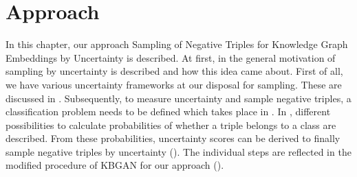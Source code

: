 \chapter{Approach}
\label{ch:approach}
%
In this chapter, our approach Sampling of Negative Triples for Knowledge Graph Embeddings by Uncertainty is described.
At first, in  the general motivation of sampling by uncertainty is described and how this idea came about.
First of all, we have various uncertainty frameworks at our disposal for sampling.
These are discussed in .
Subsequently, to measure uncertainty and sample negative triples, a classification problem needs to be defined which takes place in .
In , different possibilities to calculate probabilities of whether a triple belongs to a class are described.
From these probabilities, uncertainty scores can be derived to finally sample negative triples by uncertainty ().
The individual steps are reflected in the modified procedure of \textsc{KBGAN} for our approach ().







%
